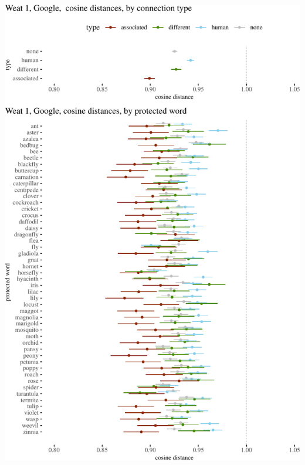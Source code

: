 \documentclass{clv3}
\begin{document}
\begin{center}\includegraphics[width=1\linewidth]{figures/resultsWeat1Googlea} \end{center}
\end{document}
